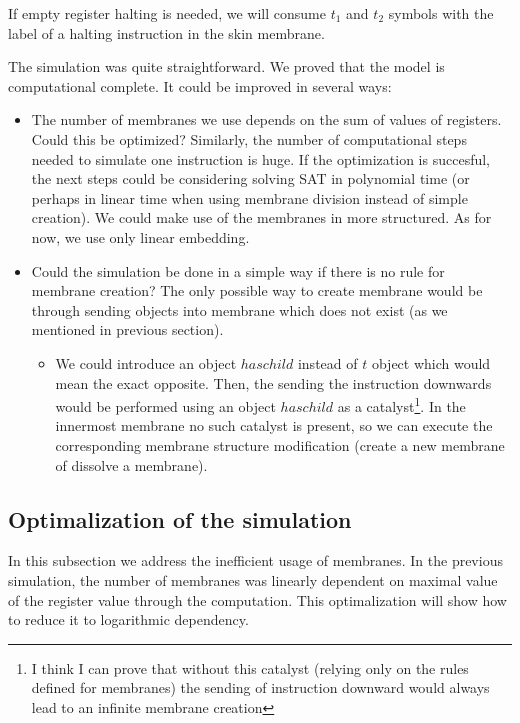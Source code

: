 \documentclass[llncs,submission,copyright,creativecommons]{../lib/lncs/llncs}
\begin{document}
If empty register halting is needed, we will consume $t_1$ and $t_2$ symbols with the label of a halting instruction in the skin membrane.

The simulation was quite straightforward. We proved that the model is computational complete. It could be improved in several ways:
\begin{itemize}
  \item The number of membranes we use depends on the sum of values of registers. Could this be optimized? Similarly, the number of computational steps needed to simulate one instruction is huge. If the optimization is succesful, the next steps could be considering solving SAT in polynomial time (or perhaps in linear time when using membrane division instead of simple creation). We could make use of the membranes in more structured. As for now, we use only linear embedding.
  \item Could the simulation be done in a simple way if there is no rule for membrane creation? The only possible way to create membrane would be through sending objects into membrane which does not exist (as we mentioned in previous section).
  \begin{itemize}
    \item We could introduce an object $haschild$ instead of $t$ object which would mean the exact opposite. Then, the sending the instruction downwards would be performed using an object $haschild$ as a catalyst\footnote{I think I can prove that without this catalyst (relying only on the rules defined for membranes) the sending of instruction downward would always lead to an infinite membrane creation}. In the innermost membrane no such catalyst is present, so we can execute the corresponding membrane structure modification (create a new membrane of dissolve a membrane).
  \end{itemize}
\end{itemize}


\subsection{Optimalization of the simulation} %
\label{sub:optimalization_of_the_simulation}

In this subsection we address the inefficient usage of membranes. In the previous simulation, the number of membranes was linearly dependent on maximal value of the register value through the computation. This optimalization will show how to reduce it to logarithmic dependency.
\end{document}
